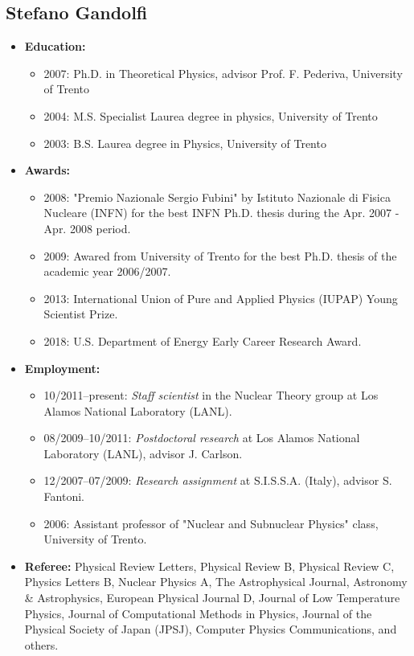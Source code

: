 \documentclass[11pt]{article}
\begin{document}
\subsection*{Stefano Gandolfi}

\begin{itemize}

\item{\bf Education:}
\begin{itemize}
\item 2007: Ph.D. in Theoretical Physics, advisor Prof. F. Pederiva, University of Trento
\item 2004: M.S. Specialist Laurea degree in physics, University of Trento
\item 2003: B.S. Laurea degree in Physics, University of Trento
\end{itemize}
\vspace{-0.25cm}
\item{\bf Awards:}
\begin{itemize}
\item 2008: "Premio Nazionale Sergio Fubini" by Istituto Nazionale di Fisica Nucleare (INFN) for 
the best INFN Ph.D. thesis during the Apr. 2007 - Apr. 2008 period.
\item 2009: Awared from University of Trento for the best Ph.D. thesis of the academic year 2006/2007.
\item 2013: International Union of Pure and Applied Physics (IUPAP) Young Scientist Prize.
\item 2018: U.S. Department of Energy Early Career Research Award.
\end{itemize}
\vspace{-0.25cm}
\item{\bf Employment:}
\begin{itemize}
\item 10/2011--present: \emph{Staff scientist} in the Nuclear Theory group at Los Alamos National Laboratory (LANL).
\item 08/2009--10/2011: \emph{Postdoctoral research} at Los Alamos National Laboratory (LANL), advisor J. Carlson.
\item 12/2007--07/2009: \emph{Research assignment} at S.I.S.S.A. (Italy), advisor S. Fantoni.
\item 2006: Assistant professor of "Nuclear and Subnuclear Physics" class, University of Trento.
\end{itemize}

\item{\bf Referee:} Physical Review Letters, Physical Review B, Physical Review C, Physics Letters B,
Nuclear Physics A, The Astrophysical Journal, Astronomy \& Astrophysics, European Physical Journal D,
Journal of Low Temperature Physics, Journal of Computational Methods in Physics, 
Journal of the Physical Society of Japan (JPSJ), Computer Physics Communications, and others.


\end{itemize}
\end{document}
